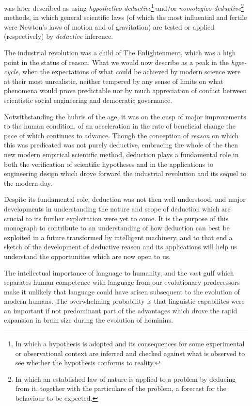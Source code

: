 \documentclass[10pt,titlepage]{book}
\begin{document}
was later described as using \emph{hypothetico-deductive}\footnote{In which a hypothesis is adopted and its consequences for some experimental or observational context are inferred and checked against what is observed to see whether the hypothesis conforms to reality.} and/or \emph{nomologico-deductive}\footnote{In which an established law of nature is applied to a problem by deducing from it, together with the particulars of the problem, a forecast for the behaviour to be expected.} methods, in which general scientific laws (of which the most influential and fertile were Newton's laws of motion and of gravitation) are tested or applied (respectively) by \emph{deductive} inference.

The industrial revolution was a child of The Enlightenment, which was a high point in the status of reason.
What we would now describe as a peak in the \emph{hype-cycle}, when the expectations of what could be achieved by modern science were at their most unrealistic, neither tempered by any sense of limits on what phenomena would prove predictable nor by much appreciation of conflict between scientistic social engineering and democratic governance.

Notwithstanding the hubris of the age, it was on the cusp of major improvements to the human condition, of an acceleration in the rate of beneficial change the pace of which continues to advance.
Though the conception of \emph{reason} on which this was predicated was not purely deductive, embracing the whole of the then new modern empirical scientific method, deduction plays a fundamental role in both the verification of scientific hypotheses and in the applications to engineering design which drove forward the industrial revolution and its sequel to the modern day.

Despite its fundamental role, deduction was not then well understood, and major developments in understanding the nature and scope of deduction which are crucial to its further exploitation were yet to come.
It is the purpose of this monograph to contribute to an understanding of how deduction can best be exploited in a future transformed by intelligent machinery, and to that end a sketch of the development of deductive reason and its applications will help us understand the opportunities which are now open to us.

The intellectual importance of language to humanity, and the vast gulf which separates human competence with language from our evolutionary predecessors make it unlikely that language could have arisen subsequent to the evolution of modern humans.
The overwhelming probability is that linguistic capabilites were an important if not predominant part of the advantages which drove the rapid expansion in brain size during the evolution of hominins.
\end{document}
